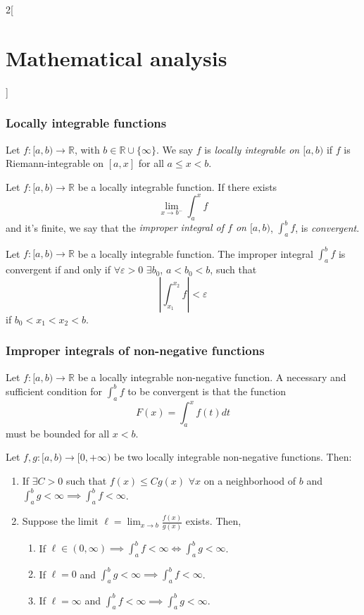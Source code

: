 \documentclass[class=article,crop=false]{standalone}
\begin{document}
\begin{multicols}{2}[\section{Mathematical analysis}]
\subsubsection*{Locally integrable functions}
\begin{definition}
Let $f:[a,b)\rightarrow\mathbb{R}$, with $b\in\mathbb{R}\cup\{\infty\}$. We say $f$ is \textit{locally integrable on $[a,b)$} if $f$ is Riemann-integrable on $[a,x]$ for all $a\leq x<b$.
\end{definition}
\begin{definition}
Let $f:[a,b)\rightarrow\mathbb{R}$ be a locally integrable function. If there exists $$\lim_{x\to b^-}\int_a^x f$$ and it's finite, we say that the \textit{improper integral of $f$ on $[a,b)$}, $\displaystyle\int_a^b f$, is \textit{convergent}.
\end{definition}
\begin{theorem}
Let $f:[a,b)\rightarrow\mathbb{R}$ be a locally integrable function. The improper integral $\displaystyle\int_a^b f$ is convergent if and only if $\forall\varepsilon>0$ $\exists b_0$, $a<b_0<b$, such that $$\left|\int_{x_1}^{x_2} f\right|<\varepsilon$$ if $b_0<x_1<x_2<b$.
\end{theorem}
\subsubsection*{Improper integrals of non-negative functions}
\begin{theorem}
Let $f:[a,b)\rightarrow\mathbb{R}$ be a locally integrable non-negative function. A necessary and sufficient condition for $\displaystyle\int_a^b f$ to be convergent is that the function $$F(x)=\displaystyle\int_a^x f(t)dt$$ must be bounded for all $x<b$.
\end{theorem}
\begin{theorem}
Let $f,g:[a,b)\rightarrow[0,+\infty)$ be two locally integrable non-negative functions. Then: 
\begin{enumerate}
    \item If $\exists C>0$ such that $f(x)\leq Cg(x)$ $\forall x$ on a neighborhood of $b$ and $\displaystyle\int_a^b g<\infty\implies\int_a^b f<\infty$.
    \item Suppose the limit $\displaystyle\ell=\lim_{x\to b}\frac{f(x)}{g(x)}$ exists. Then,
    \begin{enumerate}
        \item If $\displaystyle\ell\in(0,\infty)\implies\int_a^b f<\infty\iff\int_a^b g<\infty$.
        \item If $\ell=0$ and $\displaystyle\int_a^b g<\infty\implies\int_a^b f<\infty$.
        \item If $\ell=\infty$ and $\displaystyle\int_a^b f<\infty\implies\int_a^b g<\infty$.
    \end{enumerate}
\end{enumerate}
\end{theorem}

\end{multicols}
\end{document}
